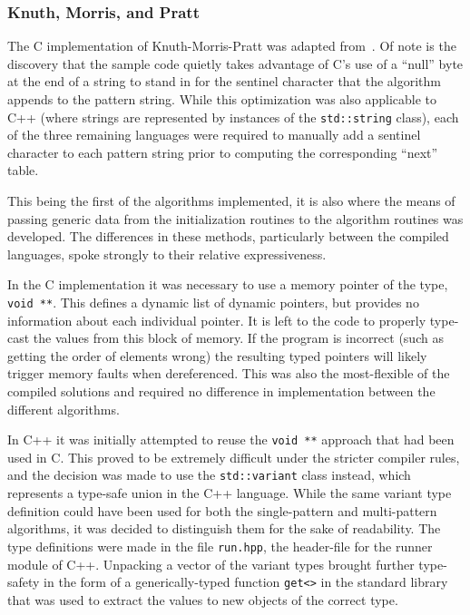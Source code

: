 \subsubsection{Knuth, Morris, and Pratt}

The C implementation of Knuth-Morris-Pratt was adapted from~\cite[Chapter 7]{handbook}. Of note is the discovery that the sample code quietly takes advantage of C's use of a ``null'' byte at the end of a string to stand in for the sentinel character that the algorithm appends to the pattern string. While this optimization was also applicable to C++ (where strings are represented by instances of the \texttt{std::string} class), each of the three remaining languages were required to manually add a sentinel character to each pattern string prior to computing the corresponding ``next'' table.

This being the first of the algorithms implemented, it is also where the means of passing generic data from the initialization routines to the algorithm routines was developed. The differences in these methods, particularly between the compiled languages, spoke strongly to their relative expressiveness.

In the C implementation it was necessary to use a memory pointer of the type, \texttt{void~**}. This defines a dynamic list of dynamic pointers, but provides no information about each individual pointer. It is left to the code to properly type-cast the values from this block of memory. If the program is incorrect (such as getting the order of elements wrong) the resulting typed pointers will likely trigger memory faults when dereferenced. This was also the most-flexible of the compiled solutions and required no difference in implementation between the different algorithms.

In C++ it was initially attempted to reuse the \texttt{void~**} approach that had been used in C. This proved to be extremely difficult under the stricter compiler rules, and the decision was made to use the \texttt{std::variant} class instead, which represents a type-safe union in the C++ language. While the same variant type definition could have been used for both the single-pattern and multi-pattern algorithms, it was decided to distinguish them for the sake of readability. The type definitions were made in the file \texttt{run.hpp}, the header-file for the runner module of C++. Unpacking a vector of the variant types brought further type-safety in the form of a generically-typed function \texttt{get<>} in the standard library that was used to extract the values to new objects of the correct type.

